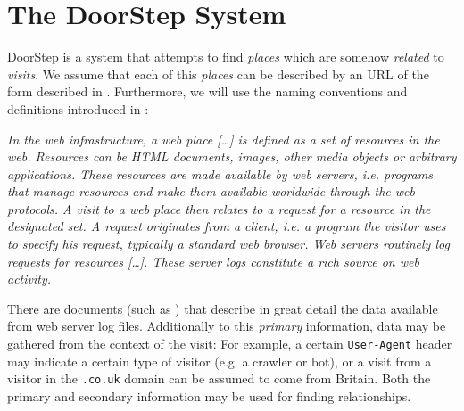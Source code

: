 \documentclass[a4paper]{danarticle}
\begin{document}
  \section*{The DoorStep System}
    DoorStep is a system that attempts to find \textit{places} which are somehow
    \textit{related} to \textit{visits}. We assume that each
    of this \textit{places} can be described by an URL of the form described in
    \cite{url}. Furthermore, we will use the naming conventions and definitions
    introduced in \cite{webaware}:
    \begin{center}
    \begin{minipage}{10cm}
    \itshape
    In the web infrastructure, a web place [\dots] is defined as 
    a set of resources in the web. Resources can
    be HTML documents, images, other media objects or arbitrary applications.
    These resources are made available by web servers, i.e. programs that manage
    resources and make them available worldwide through the web protocols. A
    visit to a web place then relates to a request for a resource in the
    designated set. A request originates from a client, i.e. a program the
    visitor uses to specify his request, typically a standard web browser. Web
    servers routinely log requests for resources [\dots]. These server logs
    constitute a rich source on web activity.
    \end{minipage}
    \end{center}
    There are documents (such as \cite{logfile}) that describe in great detail 
    the 
    data available from web server log files. Additionally to
    this \textit{primary} information, data may be gathered from the
    context of the visit: For example, a certain \verb$User-Agent$ header 
    may indicate a certain type of visitor (e.g. a crawler or bot), or a visit
    from a visitor in the \verb$.co.uk$ domain can be assumed to come from
    Britain. Both the primary and secondary information may be used for finding
    relationships.
\end{document}

